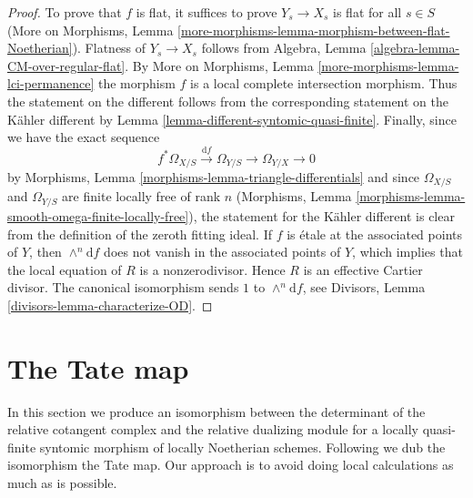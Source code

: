 \begin{proof}
To prove that $f$ is flat, it suffices to prove $Y_s \to X_s$
is flat for all $s \in S$ (More on Morphisms, Lemma
\ref{more-morphisms-lemma-morphism-between-flat-Noetherian}).
Flatness of $Y_s \to X_s$ follows from
Algebra, Lemma \ref{algebra-lemma-CM-over-regular-flat}.
By More on Morphisms, Lemma
\ref{more-morphisms-lemma-lci-permanence}
the morphism $f$ is a local complete intersection morphism.
Thus the statement on the different follows from the
corresponding statement on the K\"ahler different by
Lemma \ref{lemma-different-syntomic-quasi-finite}.
Finally, since we have the exact sequence
$$
f^*\Omega_{X/S} \xrightarrow{\text{d}f} \Omega_{Y/S} \to \Omega_{Y/X} \to 0
$$
by Morphisms, Lemma \ref{morphisms-lemma-triangle-differentials}
and since $\Omega_{X/S}$ and $\Omega_{Y/S}$ are finite locally free
of rank $n$ (Morphisms, Lemma
\ref{morphisms-lemma-smooth-omega-finite-locally-free}),
the statement for the K\"ahler different is clear from the definition
of the zeroth fitting ideal. If $f$ is \'etale at the associated
points of $Y$, then $\wedge^n\text{d}f$ does not vanish in
the associated points of $Y$, which implies that the local equation
of $R$ is a nonzerodivisor. Hence $R$ is an effective Cartier divisor.
The canonical isomorphism sends $1$ to $\wedge^n\text{d}f$, see
Divisors, Lemma \ref{divisors-lemma-characterize-OD}.
\end{proof}






\section{The Tate map}
\label{section-tate-map}

\noindent
In this section we produce an isomorphism between
the determinant of the relative cotangent complex and
the relative dualizing module for a locally quasi-finite
syntomic morphism of locally Noetherian schemes. Following
\cite[1.4.4]{Garel} we dub the isomorphism the Tate map.
Our approach is to avoid doing local calculations as
much as is possible.

